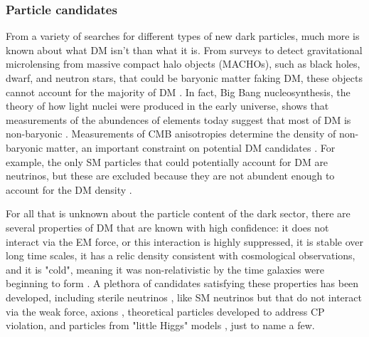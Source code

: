 \subsubsection{Particle candidates}

From a variety of searches for different types of new dark particles, much more is known about what DM isn't than what it is. From surveys to detect gravitational microlensing from massive compact halo objects (MACHOs), such as black holes, dwarf, and neutron stars, that could be baryonic matter faking DM, these objects cannot account for the majority of DM \cite{Tisserand:2006zx, Wyrzykowski:2011tr}. In fact, Big Bang nucleosynthesis, the theory of how light nuclei were produced in the early universe, shows that measurements of the abundences of elements today suggest that most of DM is non-baryonic \cite{Copi:1994ev}. Measurements of CMB anisotropies determine the density of non-baryonic matter, an important constraint on potential DM candidates \cite{Agashe:2014kda}. For example, the only SM particles that could potentially account for DM are neutrinos, but these are excluded because they are not abundent enough to account for the DM density \cite{Bertone:2004pz}. 

\indent For all that is unknown about the particle content of the dark sector, there are several properties of DM that are known with high confidence: it does not interact via the EM force, or this interaction is highly suppressed, it is stable over long time scales, it has a relic density consistent with cosmological observations, and it is "cold", meaning it was non-relativistic by the time galaxies were beginning to form \cite{Bertone:2004pz}. A plethora of candidates satisfying these properties has been developed, including sterile neutrinos \cite{Dodelson:1993je}, like SM neutrinos but that do not interact via the weak force, axions \cite{Rosenberg:2000wb}, theoretical particles developed to address CP violation, and particles from "little Higgs" models \cite{BirkedalHansen:2003mpa, Cheng:2003ju}, just to name a few. 

